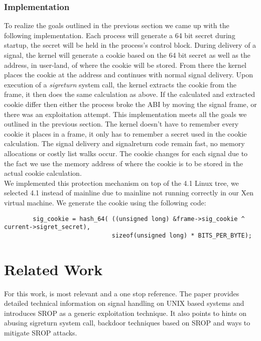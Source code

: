 \documentclass{sig-alternate-05-2015}
\begin{document}
\subsubsection{Implementation}
To realize the goals outlined in the previous section we came up with the following implementation. Each process will generate a 64 bit secret during startup, the secret will be held in the process's control block. During delivery of a signal, the kernel will generate a cookie based on the 64 bit secret as well as the address, in user-land, of where the cookie will be stored. From there the kernel places the cookie at the address and continues with normal signal delivery. Upon execution of a \textit{sigreturn} system call, the kernel extracts the cookie from the frame, it then does the same calculation as above. If the calculated and extracted cookie differ then either the process broke the ABI by moving the signal frame, or there was an exploitation attempt. This implementation meets all the goals we outlined in the previous section. The kernel doesn't have to remember every cookie it places in a frame, it only has to remember a secret used in the cookie calculation. The signal delivery and signalreturn code remain fast, no memory allocations or costly list walks occur. The cookie changes for each signal due to the fact we use the memory address of where the cookie is to be stored in the actual cookie calculation.
\\
\indent
We implemented this protection mechanism on top of the 4.1 Linux tree, we selected 4.1 instead of mainline due to mainline not running correctly in our Xen virtual machine. We generate the cookie using the following code:
\\
\begin{verbatim}
        sig_cookie = hash_64( ((unsigned long) &frame->sig_cookie ^ current->sigret_secret),
                              sizeof(unsigned long) * BITS_PER_BYTE);
\end{verbatim}


\section{Related Work}
For this work, \cite{bosman2014framing} is most relevant and a one 
stop reference. The paper provides detailed technical information 
on signal handling on UNIX based systems and introduces SROP as a 
generic exploitation technique. It also points to hints on abusing 
sigreturn system call, backdoor techniques based on SROP and ways to 
mitigate SROP attacks. 
\end{document}
